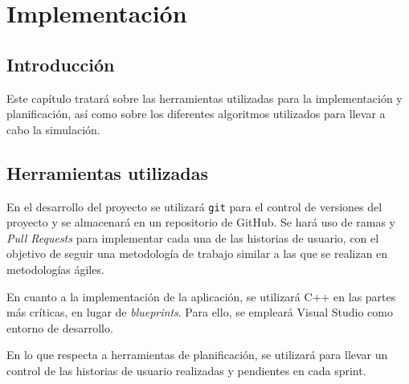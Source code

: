\chapter{Implementación}

\section{Introducción}

Este capítulo tratará sobre las herramientas utilizadas para la implementación y planificación, así como sobre los diferentes algoritmos utilizados para llevar a cabo la simulación.

\section{Herramientas utilizadas}
En el desarrollo del proyecto se utilizará \verb|git| para el control de versiones del proyecto y se almacenará en un repositorio de GitHub. Se hará uso de ramas y \textit{Pull Requests} para implementar cada una de las historias de usuario, con el objetivo de seguir una metodología de trabajo similar a las que se realizan en metodologías ágiles.


\bigskip

En cuanto a la implementación de la aplicación, se utilizará C++ en las partes más críticas, en lugar de \textit{blueprints}. Para ello, se empleará Visual Studio como entorno de desarrollo.

\bigskip

En lo que respecta a herramientas de planificación, se utilizará \planApp para llevar un control de las historias de usuario realizadas y pendientes en cada sprint.

